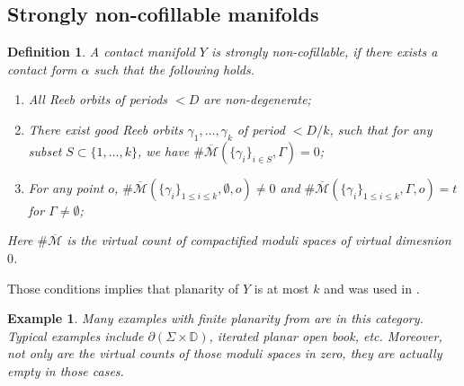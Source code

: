 \documentclass[11pt]{amsart}
\numberwithin{equation}{section}
\newtheorem{definition}[theorem]{\textbf{Definition}}
\newtheorem{example}[theorem]{\textbf{Example}}
\def\D{{\mathbb D}}
\def\cM{{\mathcal M}}
\begin{document}
\subsection{Strongly non-cofillable manifolds}

\begin{definition}\label{def:strongly_not_cofillable}
    A contact manifold $Y$ is strongly non-cofillable, if there exists a contact form $\alpha$ such that the following holds. 
    \begin{enumerate}
    \item All Reeb orbits of periods $<D$ are non-degenerate;
    \item There exist good Reeb orbits $\gamma_1,\ldots,\gamma_k$ of period $<D/k$, such that for any subset $S\subset \{ 1,\ldots,k\}$, we have $\#\overline{\cM}(\{\gamma_i\}_{i\in S}, \Gamma)=0$;
    \item For any point $o$, $\#\overline{\cM}(\{\gamma_i\}_{1\le i \le k},\emptyset,o)\ne 0$ and $\#\overline{\cM}(\{\gamma_i\}_{1\le i \le k},\Gamma,o)=t$ for $\Gamma \ne \emptyset$;
\end{enumerate}
Here $\#\overline{\cM}$ is the virtual count of compactified moduli spaces of virtual dimesnion $0$.
\end{definition}
Those conditions implies that planarity \cite[Definition 3.24]{moreno2024landscape} of $Y$ is at most $k$ and was used in \cite[Proposition 4.7]{moreno2024rsft}. 

\begin{example}
    Many examples with finite planarity from \cite{moreno2024landscape} are in this category. Typical examples include $\partial(\Sigma \times \D)$, iterated planar open book, etc. Moreover, not only are the virtual counts of those moduli spaces in  zero, they are actually empty in those cases.
\end{example}
\end{document}
